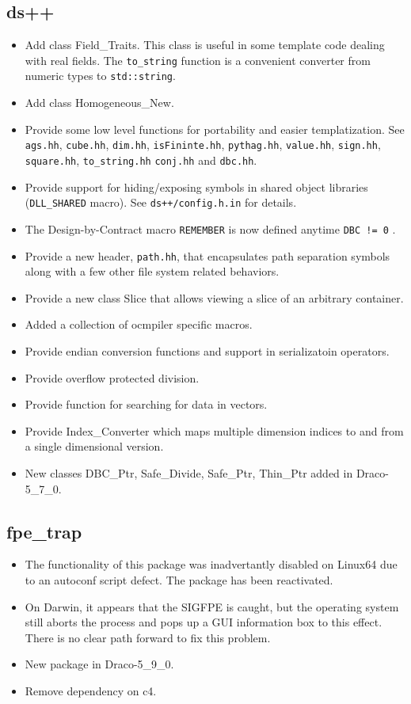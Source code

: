 \documentclass[note]{ResearchNote}
\newcommand{\draco}{Draco}
\begin{document}
\subsection{ds++}
\label{chagnes:dsxx}
\begin{itemize}
\item Add class \textsf{Field\_Traits}. This class is useful in some
  template code dealing with real fields.  The \texttt{to\_string}
  function is a convenient converter from numeric types to
  \texttt{std::string}.
\item Add class \textsf{Homogeneous\_New}.
\item Provide some low level functions for portability and easier
  templatization.  See \texttt{ags.hh}, \texttt{cube.hh},
  \texttt{dim.hh}, \texttt{isFininte.hh}, \texttt{pythag.hh},
  \texttt{value.hh}, \texttt{sign.hh}, \texttt{square.hh},
  \texttt{to\_string.hh} \texttt{conj.hh} and \texttt{dbc.hh}.
\item Provide support for hiding/exposing symbols in shared object
  libraries (\texttt{DLL\_SHARED} macro).  See
  \texttt{ds++/config.h.in} for details.
\item The Design-by-Contract macro \texttt{REMEMBER} is now defined
  anytime \texttt{DBC != 0} .
\item Provide a new header, \texttt{path.hh}, that encapsulates path
  separation symbols along with a few other file system related
  behaviors.
\item Provide a new class \textsf{Slice} that allows viewing a slice
  of an arbitrary container.
\item Added a collection of ocmpiler specific macros.
\item Provide endian conversion functions and support in serializatoin
  operators.
\item Provide overflow protected division.
\item Provide function for searching for data in vectors.
\item Provide \textsf{Index\_Converter} which maps multiple dimension
  indices to and from a single dimensional version.
\item New classes \textsf{DBC\_Ptr}, \textsf{Safe\_Divide},
  \textsf{Safe\_Ptr}, \textsf{Thin\_Ptr} added in \draco-5\_7\_0.
\end{itemize}

\subsection{fpe\_trap}
\label{change:fpe-trap}
\begin{itemize}
\item The functionality of this package was inadvertantly disabled on
  Linux64 due to an autoconf script defect.  The package has been
  reactivated.
\item On Darwin, it appears that the SIGFPE is caught, but the
  operating system still aborts the process and pops up a GUI
  information box to this effect.  There is no clear path forward to
  fix this problem.
\item New package in \draco-5\_9\_0.
\item Remove dependency on \textsf{c4}.
\end{itemize}
\end{document}
